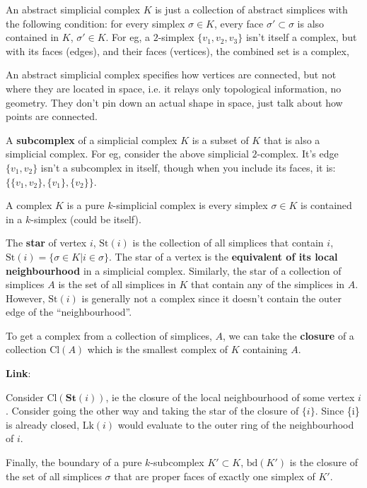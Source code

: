 \begin{definition}
    An abstract simplicial complex $K$ is just a collection of abstract simplices with the following condition: for every simplex $\sigma\in K$, every face $\sigma'\subset\sigma$ is also contained in $K$, $\sigma'\in K$. For eg, a $2$-simplex $\{v_1,v_2,v_3\}$ isn't itself a complex, but with its faces (edges), and their faces (vertices), the combined set is a complex,

    An abstract simplicial complex specifies how vertices are connected, but not where they are located in space, i.e. it relays only topological information, no geometry. They don't pin down an actual shape in space, just talk about how points are connected. 
    
    A \textbf{subcomplex} of a simplicial complex $K$ is a subset of $K$ that is also a simplicial complex. For eg, consider the above simplicial $2$-complex. It's edge $\{v_1,v_2\}$ isn't a subcomplex in itself, though when you include its faces, it is: $\{ \{v_1,v_2\}, \{v_1\}, \{v_2\}\}$.
    
    A complex $K$ is a pure $k$-simplicial complex is every simplex $\sigma\in K$ is contained in a $k$-simplex (could be itself).
\end{definition}

\begin{definition}
    The \textbf{star} of vertex $i$, $\text{St}(i)$ is the collection of all simplices that contain $i$, $\text{St}(i) = \{\sigma\in K | i\in\sigma\}$. The star of a vertex is the \textbf{equivalent of its local neighbourhood} in a simplicial complex. Similarly, the star of a collection of simplices $A$ is the set of all simplices in $K$ that contain any of the simplices in $A$. However, $\text{St}(i)$ is generally not a complex since it doesn't contain the outer edge of the ``neighbourhood''.
    
    To get a complex from a collection of simplices, $A$, we can take the \textbf{closure} of a collection $\text{Cl}(A)$ which is the smallest complex of $K$ containing $A$.
    
    \textbf{Link}:
    
    Consider $\text{Cl}(\textbf{St}(i))$, ie the closure of the local neighbourhood of some vertex $i$. Consider going the other way and taking the star of the closure of $\{i\}$. Since \{i\} is already closed, $\text{Lk}(i)$ would evaluate to the outer ring of the neighbourhood of $i$.
    
    Finally, the boundary of a pure $k$-subcomplex $K'\subset K$, $\text{bd}(K')$ is the closure of the set of all simplices $\sigma$ that are proper faces of exactly one simplex of $K'$.
    
\end{definition}

